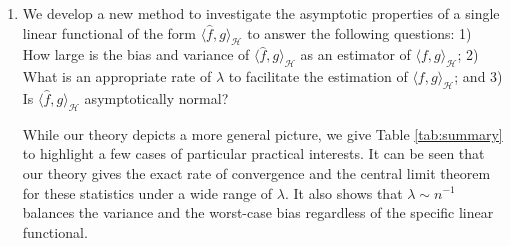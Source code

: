 \documentclass[12pt]{article}
\theoremstyle{plain}
\theoremstyle{remark}
\begin{document}
\begin{enumerate}
    \item 
We develop a new method to investigate the asymptotic properties of a single linear functional of the form $\langle \hat{f},g\rangle_{\mathcal{H}}$ to answer the following questions: 1) How large is the bias and variance of $\langle \hat{f},g\rangle_\mathcal{H}$ as an estimator of $\langle f,g\rangle_\mathcal{H}$; 2) What is an appropriate rate of $\lambda$ to facilitate the estimation of $\langle f,g\rangle_\mathcal{H}$; and 3) Is $\langle \hat{f},g\rangle_\mathcal{H}$ asymptotically normal?

While our theory depicts a more general picture, we give Table \ref{tab:summary} to highlight a few cases of particular practical interests. It can be seen that our theory gives the exact rate of convergence and the central limit theorem for these statistics under a wide range of $\lambda$. It also shows that $\lambda\sim n^{-1}$  balances the variance and the worst-case bias regardless of the specific linear functional.

\begin{table}[h]
    \caption{Summary of asymptotic properties of linear functionals of practical interest, where $d=$ input dimension, $m=$ smoothness, $|\alpha|=$ total order of derivatives. Exact upper and lower rates of convergence are given, except for the worst-case bias for the $L_2$ inner product. Discussions regarding this matter is made in Section \ref{sec:semiparametric} of Supplementary Material.}
    \label{tab:summary}
\end{table}


\end{enumerate}
\end{document}
